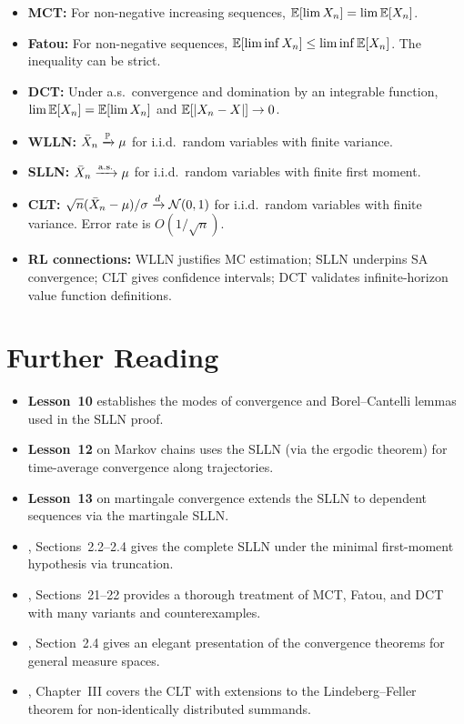 \documentclass[11pt,a4paper]{article}
\begin{document}
\begin{itemize}[nosep]
  \item \textbf{MCT:} For non-negative increasing sequences,
    $\mathbb{E}[\lim X_n] = \lim \mathbb{E}[X_n]$.
  \item \textbf{Fatou:} For non-negative sequences,
    $\mathbb{E}[\liminf X_n] \leq \liminf \mathbb{E}[X_n]$.
    The inequality can be strict.
  \item \textbf{DCT:} Under a.s.\ convergence and domination
    by an integrable function,
    $\lim \mathbb{E}[X_n] = \mathbb{E}[\lim X_n]$ and
    $\mathbb{E}[|X_n - X|] \to 0$.
  \item \textbf{WLLN:} $\bar{X}_n \xrightarrow{\mathbb{P}} \mu$ for i.i.d.\
    random variables with finite variance.
  \item \textbf{SLLN:} $\bar{X}_n \xrightarrow{\text{a.s.}} \mu$ for i.i.d.\
    random variables with finite first moment.
  \item \textbf{CLT:}
    $\sqrt{n}(\bar{X}_n - \mu)/\sigma \xrightarrow{d} \mathcal{N}(0,1)$
    for i.i.d.\ random variables with finite variance.
    Error rate is $O(1/\sqrt{n})$.
  \item \textbf{RL connections:} WLLN justifies MC estimation;
    SLLN underpins SA convergence; CLT gives confidence intervals;
    DCT validates infinite-horizon value function definitions.
\end{itemize}


\section{Further Reading}
\label{sec:further_reading}

\begin{itemize}[nosep]
  \item \textbf{Lesson~10} establishes the modes of convergence
    and Borel--Cantelli lemmas used in the SLLN proof.
  \item \textbf{Lesson~12} on Markov chains uses the SLLN
    (via the ergodic theorem) for time-average convergence
    along trajectories.
  \item \textbf{Lesson~13} on martingale convergence extends
    the SLLN to dependent sequences via the martingale SLLN.
  \item \citet{durrett2019}, Sections~2.2--2.4 gives the
    complete SLLN under the minimal first-moment hypothesis
    via truncation.
  \item \citet{billingsley1995}, Sections~21--22 provides a
    thorough treatment of MCT, Fatou, and DCT with many
    variants and counterexamples.
  \item \citet{folland1999}, Section~2.4 gives an elegant
    presentation of the convergence theorems for general
    measure spaces.
  \item \citet{shiryaev2016}, Chapter~III covers the CLT
    with extensions to the Lindeberg--Feller theorem for
    non-identically distributed summands.
\end{itemize}


\end{document}
